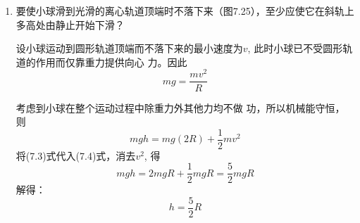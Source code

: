 \begin{enumerate}
\begin{solution}
    设斜坡长为$\ell$, 人滑至斜面底端时的速度为$v$. 在下
    滑过程中，重力做功为$mgh$, 摩擦力做功为
\[-\mu mg\ell \cos\theta=-\mu mg\cos\theta\cdot \frac{h}{\sin\theta}=-\mu\frac{mgh}{\tan\theta}\]

根据动能定理：
\begin{equation}
    mgh-\frac{\mu mgh}{\tan\theta}=\frac{1}{2}mv^2
\end{equation}
在水平面上滑行阶段，只有摩擦力做功，则根据动能定理
可得。
\begin{equation}
    -\mu mgs_1=-\frac{1}{2}mv^2
\end{equation}
(7.1)式和(7.2)式相加，消去$\frac{1}{2}mv^2$，得
\[mgh-\frac{mu mgh}{\tan\theta}-\mu mgs_1=0\]
解得：\[s_1=\frac{h}{\mu}-\frac{h}{\tan\theta}\]
又因为$s-s_1=\dfrac{h}{\tan\theta}$，所以
\[s=s_1+\frac{h}{\tan\theta}=\frac{h}{\mu}-\frac{h}{\tan\theta}+\frac{h}{\tan\theta}=\frac{h}{\mu}\]
可见，$s$与角度$\theta$无关，所以若改变斜坡倾角$\theta$, 水平距离$s$将
不改变。

说明：这一题如果把斜面和平面上的运动看作是一个运
动过程，也可以同样应用动能定理。但此时摩擦力做功要分
两段计算后相加。因为在这两个阶段中，摩擦力的大小是不
同的，全过程的动能定理形式应为：
\[mgh-\frac{mu mgh}{\tan\theta}-\mu mgs_1=0\]
与前一种解法中消去
$\frac{1}{2}mv^2$后的式子一样，但对一般同学来
说，还是分段应用动能定理为好。
\end{solution}
\item 要使小球滑到光滑的离心轨道顶端时不落下来（图7.25），至少应使它在斜轨上多高处由静止开始下滑？


\begin{figure}[htp]\centering
    \caption{}
\end{figure}


\begin{solution}
    设小球运动到圆形轨道顶端而不落下来的最小速度为$v$, 此时小球已不受圆形轨道的作用而仅靠重力提供向心
    力。因此
    \begin{equation}
        mg=\frac{mv^2}{R}
    \end{equation}

    考虑到小球在整个运动过程中除重力外其他力均不做
    功，所以机械能守恒，则
\begin{equation}
    mgh=mg(2R)+\frac{1}{2}mv^2
\end{equation}
将(7.3)式代入(7.4)式，消去$v^2$, 得
\[mgh=2mgR+\frac{1}{2}mgR=\frac{5}{2}mgR\]
解得：
\[h=\frac{5}{2}R\]
\end{solution}
\end{enumerate}


